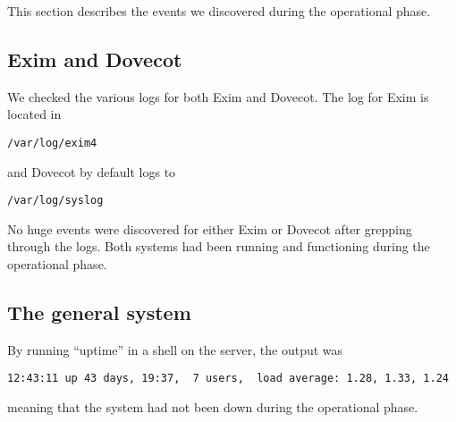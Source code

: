 
This section describes the events we discovered during the operational
phase.
\subsection{Exim and Dovecot}
We checked the various logs for both Exim and Dovecot. The log for Exim
is located in \begin{verbatim}/var/log/exim4\end{verbatim} and Dovecot
by default logs to \begin{verbatim}/var/log/syslog\end{verbatim}

No huge events were discovered for either Exim or Dovecot after
grepping through the logs. Both systems had been running and functioning
during the operational phase.
\subsection{The general system}
By running ``uptime'' in a shell on the server, the output was
\begin{verbatim}12:43:11 up 43 days, 19:37,  7 users,  load average: 1.28, 1.33, 1.24\end{verbatim}
meaning that the system had not been down during the operational phase.

